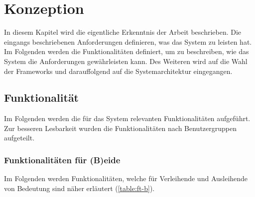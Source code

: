 \chapter{Konzeption}
\label{chapter-konzept}

In diesem Kapitel wird die eigentliche Erkenntnis der Arbeit beschrieben. Die eingangs beschriebenen
Anforderungen definieren, was das System zu leisten hat. Im Folgenden werden die Funktionalitäten
definiert, um zu beschreiben, wie das System die Anforderungen gewährleisten kann. Des Weiteren wird
auf die Wahl der Frameworks und darauffolgend auf die Systemarchitektur eingegangen.

\section{Funktionalität}
\label{section:funktionalitaeten}
Im Folgenden werden die für das System relevanten Funktionalitäten aufgeführt. Zur besseren
Lesbarkeit wurden die Funktionalitäten nach Benutzergruppen aufgeteilt.

\subsection{Funktionalitäten für (B)eide}
Im Folgenden werden Funktionalitäten, welche für Verleihende und Ausleihende von Bedeutung sind
näher erläutert (\ref{table:ft-b}).

